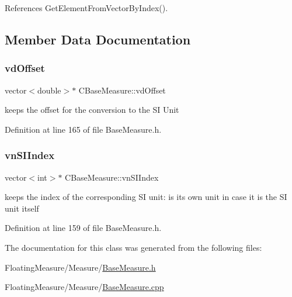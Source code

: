 References Get\+Element\+From\+Vector\+By\+Index().



\subsection{Member Data Documentation}
\mbox{\label{classCBaseMeasure_a7220e3dfd4fbdd319a5c3c6af844259e}} 
\subsubsection{\texorpdfstring{vd\+Offset}{vdOffset}}
{\footnotesize\ttfamily vector$<$double$>$$\ast$ C\+Base\+Measure\+::vd\+Offset}



keeps the offset for the conversion to the SI Unit 



Definition at line 165 of file Base\+Measure.\+h.

\mbox{\label{classCBaseMeasure_aaaddf8a6ce321b282885953439472390}} 
\subsubsection{\texorpdfstring{vn\+S\+I\+Index}{vnSIIndex}}
{\footnotesize\ttfamily vector$<$int$>$$\ast$ C\+Base\+Measure\+::vn\+S\+I\+Index}



keeps the index of the corresponding SI unit\+: is its own unit in case it is the SI unit itself 



Definition at line 159 of file Base\+Measure.\+h.



The documentation for this class was generated from the following files\+:\begin{DoxyCompactItemize}
\item 
Floating\+Measure/\+Measure/\hyperlink{BaseMeasure_8h}{Base\+Measure.\+h}\item 
Floating\+Measure/\+Measure/\hyperlink{BaseMeasure_8cpp}{Base\+Measure.\+cpp}\end{DoxyCompactItemize}
